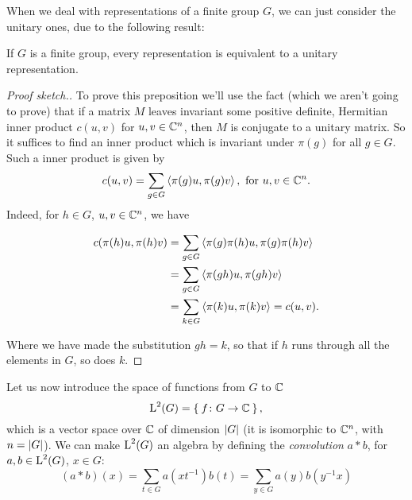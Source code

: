 When we deal with representations of a finite group $G$, we can just consider the unitary ones, due to the following result:
\begin{prop}
\label{unit:eqiv}
If $G$ is a finite group, every representation is equivalent to a unitary representation.
\end{prop}
\begin{proof}[Proof sketch.]
To prove this preposition we'll use the fact (which we aren't going to prove) that if a matrix $M$ leaves invariant some positive definite, Hermitian inner product $c(u,v)$ for $u,v \in {\mathbb C}^n$, then $M$ is conjugate to a unitary matrix.
So it suffices to find an inner product which is invariant under $\pi(g)$ for all $g \in G$. Such a inner product is given by 
\[
c(u,v)= \sum_{g \in G} \Braket{ \pi(g)u, \pi(g)v } , \text{ for } u,v \in {\mathbb C}^n.
\]
Indeed, for $h\in G$, $u,v\in {\mathbb C}^n$, we have

\[
\begin{split}
c(\pi(h)u,\pi(h)v) &= \sum_{g \in G} \Braket{ \pi(g)\pi(h)u, \pi(g)\pi(h)v } \\
&=\sum_{g \in G} \Braket{ \pi(gh)u, \pi(gh)v } \\
&=\sum_{k \in G} \Braket{ \pi(k)u, \pi(k)v }= c(u,v).\\
\end{split}
\]

Where we have made the substitution $gh=k$, so that if $h$ runs through all the elements in $G$, so does $k$. 
\end{proof}
Let us now introduce  the space of functions from $G$ to ${\mathbb C}$ 
\begin{equation*}
\operatorname{L}^2(G)=\Set{f\colon G \rightarrow {\mathbb C}},
\end{equation*}
which is a vector space over ${\mathbb C}$ of dimension $\lvert G\rvert$ (it is isomorphic to ${\mathbb C}^n$, with $n=\lvert G\rvert$).
We can make $\operatorname{L}^2(G)$ an algebra by defining the \emph{convolution} $a\ast b$, for $a,b\in \operatorname{L}^2(G)$, $x\in G$:
\begin{equation*}
(a\ast b)(x)=\sum_{t \in G} a(xt^{-1})b(t)=\sum_{y \in G} a(y)b(y^{-1}x)
\end{equation*}
